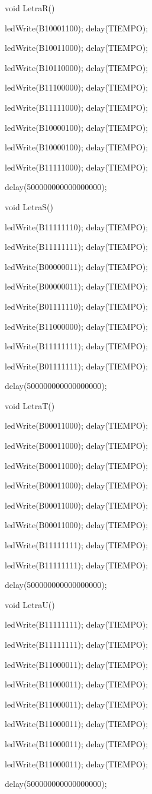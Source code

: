 \documentclass{article}
\begin{document}
void LetraR(){

   ledWrite(B10001100); delay(TIEMPO);

   ledWrite(B10011000); delay(TIEMPO);

   ledWrite(B10110000); delay(TIEMPO);

   ledWrite(B11100000); delay(TIEMPO);

   ledWrite(B11111000); delay(TIEMPO);

   ledWrite(B10000100); delay(TIEMPO);

   ledWrite(B10000100); delay(TIEMPO);

   ledWrite(B11111000); delay(TIEMPO);

   delay(500000000000000000);}

void LetraS(){

   ledWrite(B11111110); delay(TIEMPO);

   ledWrite(B11111111); delay(TIEMPO);

   ledWrite(B00000011); delay(TIEMPO);

   ledWrite(B00000011); delay(TIEMPO);

   ledWrite(B01111110); delay(TIEMPO);

   ledWrite(B11000000); delay(TIEMPO);

   ledWrite(B11111111); delay(TIEMPO);

   ledWrite(B01111111); delay(TIEMPO);

  delay(500000000000000000);}

void LetraT(){

   ledWrite(B00011000); delay(TIEMPO);

   ledWrite(B00011000); delay(TIEMPO);

   ledWrite(B00011000); delay(TIEMPO);

   ledWrite(B00011000); delay(TIEMPO);

   ledWrite(B00011000); delay(TIEMPO);

   ledWrite(B00011000); delay(TIEMPO);

   ledWrite(B11111111); delay(TIEMPO);

   ledWrite(B11111111); delay(TIEMPO);

  delay(500000000000000000);}

void LetraU(){

   ledWrite(B11111111); delay(TIEMPO);

   ledWrite(B11111111); delay(TIEMPO);

   ledWrite(B11000011); delay(TIEMPO);

   ledWrite(B11000011); delay(TIEMPO);

   ledWrite(B11000011); delay(TIEMPO);

   ledWrite(B11000011); delay(TIEMPO);

   ledWrite(B11000011); delay(TIEMPO);

   ledWrite(B11000011); delay(TIEMPO);

  delay(500000000000000000);}
\end{document}
